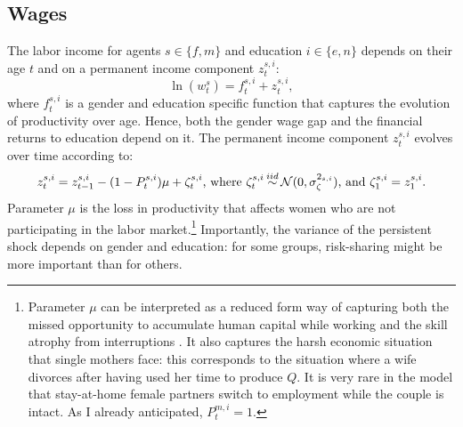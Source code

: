 \documentclass[12pt]{article}
\newcommand\iidsim{\stackrel{\mathclap{iid}}{\sim}}
\begin{document}
 \subsection{Wages}
The labor income for agents $s\in\{f,m\}$ and education $i\in\{e,n\}$ depends on their age $t$ and on a permanent income component $z^{s,i}_t$:
\[\ln(w^s_t)=f^{s,i}_t+z^{s,i}_t,\]
where $f^{s,i}_t$ is a gender and education specific function that captures the evolution of productivity over age. Hence, both the gender wage gap and the financial returns to education depend on it. The permanent income component  $z^{s,i}_t$ evolves over time according to:
\begin{equation}\label{eq:pcomp}
z^{s,i}_t=z^{s,i}_{t-1}-(1-P_t^{s,i}) \mu+\zeta^{s,i}_{t}\text{, where }\zeta^{s,i}_{t}\iidsim\mathcal{N}(0,\sigma_\zeta^{2_{s,i}})\text{, and }\zeta^{s,i}_{1}=z^{s,i}_{1}.
\end{equation}
Parameter $\mu$ is the loss in productivity that affects women who are not participating in the labor market.\footnote{Parameter $\mu$ can be interpreted as a reduced form way of capturing both the missed opportunity to accumulate human capital while working and the skill atrophy from interruptions \citep{adda2017}. It also captures the harsh economic situation that single mothers face: this corresponds to the situation where a wife divorces after having used her time to produce $Q$. It is very rare in the model that stay-at-home female partners switch to employment while the couple is intact. As I already anticipated, $P_t^{m,i}=1$.} Importantly, the variance of the persistent shock depends on gender and education: for some groups, risk-sharing might be more important than for others.
\end{document}

